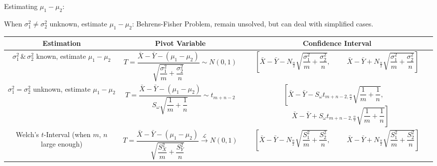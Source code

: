 \documentclass[11pt,a4paper]{ctexart}
\numberwithin{equation}{section}%
\begin{document}
\begin{enumerate}
    Estimating $\mu_1-\mu_2$:
    
    When $\sigma_1^2\neq\sigma^2_2$ unknown, estimate $\mu_1-\mu_2$: Behrens-Fisher Problem, remain unsolved, but can deal with simplified cases. 

    \begin{table}[htbp]
        \centering
        \renewcommand\arraystretch{2.2}
        \begin{tabular}{|c|c|c|}
            \hline
            Estimation& Pivot Variable & Confidence Interval\\
            \hline
            \makecell{$\sigma_1^2\,\&\,\sigma_2^2$ known,\\estimate $\mu_1-\mu_2$}&$ T=\dfrac{\bar{X}-\bar{Y}-(\mu_1-\mu_2)}{\sqrt{\dfrac{\sigma_1^2}{m}+\dfrac{\sigma^2_2}{n}}}\sim N(0,1)$&\makecell{$\left[\bar{X}-\bar{Y}-N_{\frac{\alpha}{2}}\sqrt{\dfrac{\sigma_1^2}{m}+\dfrac{\sigma_2^2}{n}},\right.\quad $\\$\quad\left.\bar{X}-\bar{Y}+N_{\frac{\alpha}{2}}\sqrt{\dfrac{\sigma_1^2}{m}+\dfrac{\sigma_2^2}{n}}   \right]$}\\
            \hline
            \makecell{$\sigma_1^2=\sigma^2_2$ unknown,\\estimate $\mu_1-\mu_2$}&$T=\dfrac{\bar{X}-\bar{Y}-(\mu_1-\mu_2)}{S_\omega\sqrt{\dfrac{1}{m}+\dfrac{1}{n}}}\sim t_{m+n-2}$&\makecell{$\left[\bar{X}-\bar{Y}-S_\omega t_{m+n-2,\frac{\alpha}{2}}\sqrt{\dfrac{1}{m}+\dfrac{1}{n}}\right.,\quad $\\$\left.\quad\bar{X}-\bar{Y}+S_\omega t_{m+n-2,\frac{\alpha}{2}}\sqrt{\dfrac{1}{m}+\dfrac{1}{n}} \right]$}\\
            \hline
            \makecell{Welch's $t$-Interval\\(when $m$, $n$ large enough)}&$T=\dfrac{\bar{X}-\bar{Y}-(\mu_1-\mu_2)}{\sqrt{\dfrac{S_X^2}{m}+\dfrac{S^2_Y}{n}}}\xrightarrow[]{\mathscr{L}} N(0,1)$&\makecell{$\left[\bar{X}-\bar{Y}-N_{\frac{\alpha}{2}}\sqrt{\dfrac{S_1^2}{m}+\dfrac{S_2^2}{n}}\right.,\quad$\\$\quad\left.\bar{X}-\bar{Y}+N_{\frac{\alpha}{2}}\sqrt{\dfrac{S_1^2}{m}+\dfrac{S_2^2}{n}}\right]$}\\
            \hline
        \end{tabular}
    \end{table}


\end{enumerate}
\end{document}
